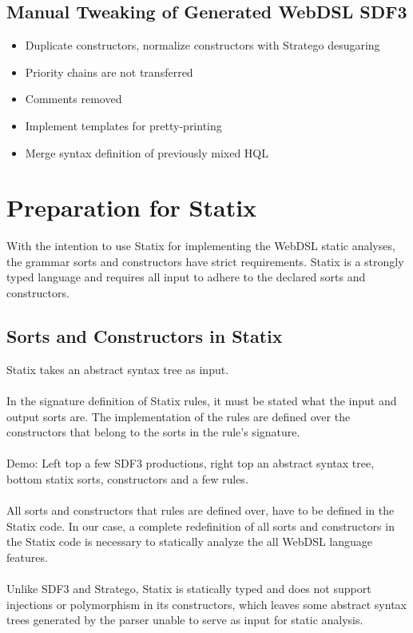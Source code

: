     \subsection{Manual Tweaking of Generated WebDSL SDF3}

      \begin{itemize}
        \item Duplicate constructors, normalize constructors with Stratego desugaring
        \item Priority chains are not transferred
        \item Comments removed
        \item Implement templates for pretty-printing
        \item Merge syntax definition of previously mixed HQL
      \end{itemize}

  \section{Preparation for Statix}

    With the intention to use Statix for implementing the WebDSL static analyses, the grammar sorts and constructors have strict requirements. Statix is a strongly typed language and requires all input to adhere to the declared sorts and constructors.

    \subsection{Sorts and Constructors in Statix}

      Statix takes an abstract syntax tree as input.
      \\\\In the signature definition of Statix rules, it must be stated what the input and output sorts are. The implementation of the rules are defined over the constructors that belong to the sorts in the rule's signature.
      \\\\Demo: Left top a few SDF3 productions, right top an abstract syntax tree, bottom statix sorts, constructors and a few rules.
      \\\\All sorts and constructors that rules are defined over, have to be defined in the Statix code. In our case, a complete redefinition of all sorts and constructors in the Statix code is necessary to statically analyze the all WebDSL language features.
      \\\\Unlike SDF3 and Stratego, Statix is statically typed and does not support injections or polymorphism in its constructors, which leaves some abstract syntax trees generated by the parser unable to serve as input for static analysis.

